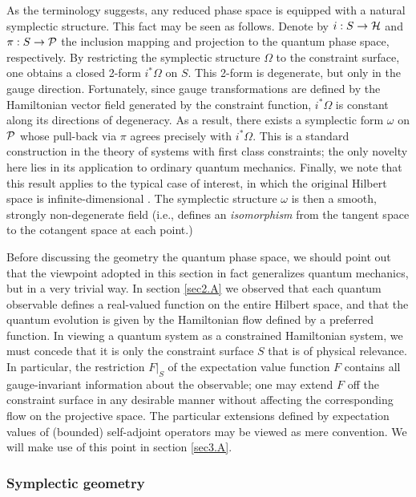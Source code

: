 \documentclass[12pt,aps,eqsecnum,tighten]{revtex4-2}
\def\H{{\cal H}}
\def\P{{\cal P}}
\def\w{\omega}
\def\W{\Omega}
\begin{document}
As the terminology suggests, any reduced phase space is equipped with
a natural symplectic structure.  This fact may be seen as follows.
Denote by $i:S\rightarrow\H$ and $\pi:S\rightarrow\P$ the inclusion
mapping and projection to the quantum phase space, respectively.  By
restricting the symplectic structure $\W$ to the constraint surface,
one obtains a closed 2-form $i^*\W$ on $S$.  This 2-form is
degenerate, but only in the gauge direction.  Fortunately, since gauge
transformations are defined by the Hamiltonian vector field generated
by the constraint function, $i^*\W$ is constant along its directions
of degeneracy.  As a result, there exists a symplectic form $\w$ on
$\P$ whose pull-back via $\pi$ agrees precisely with $i^*\W$. This is
a standard construction in the theory of systems with first class
constraints; the only novelty here lies in its application to ordinary
quantum mechanics.  Finally, we note that this result applies to the
typical case of interest, in which the original Hilbert space is
infinite-dimensional \cite{thesis}. The symplectic structure $\omega$
is then a smooth, strongly non-degenerate field (i.e., defines an {\it
isomorphism} from the tangent space to the cotangent space at each
point.)

Before discussing the geometry the quantum phase space, we should
point out that the viewpoint adopted in this section in fact
generalizes quantum mechanics, but in a very trivial way.  In section
\ref{sec2.A} we observed that each quantum observable defines a
real-valued function on the entire Hilbert space, and that the quantum
evolution is given by the Hamiltonian flow defined by a preferred
function.  In viewing a quantum system as a constrained Hamiltonian
system, we must concede that it is only the constraint surface $S$
that is of physical relevance.  In particular, the restriction $F|_S$
of the expectation value function $F$ contains all gauge-invariant
information about the observable; one may extend $F$ off the
constraint surface in any desirable manner without affecting the
corresponding flow on the projective space.  The particular extensions
defined by expectation values of (bounded) self-adjoint operators may
be viewed as mere convention.  We will make use of this point in
section \ref{sec3.A}.


\subsubsection{Symplectic geometry}
\end{document}
